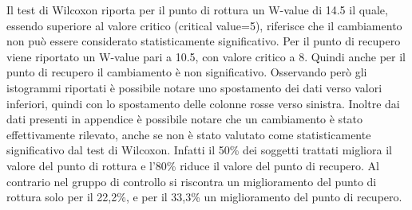 Il test di Wilcoxon riporta per il punto di rottura un W-value di 14.5 il quale, essendo superiore al valore critico (critical value=5), riferisce che il cambiamento non può essere considerato statisticamente significativo. Per il punto di recupero viene riportato un W-value pari a 10.5, con valore critico a 8. Quindi anche per il punto di recupero il cambiamento è non significativo. Osservando però gli istogrammi riportati è possibile notare uno spostamento dei dati verso valori inferiori, quindi con lo spostamento delle colonne rosse verso sinistra. Inoltre dai dati presenti in appendice è possibile notare che un cambiamento è stato effettivamente rilevato, anche se non è stato valutato come statisticamente significativo dal test di Wilcoxon. Infatti il 50\% dei soggetti trattati migliora il valore del punto di rottura e l’80\% riduce il valore del punto di recupero. Al contrario nel gruppo di controllo si riscontra un miglioramento del punto di rottura solo per il 22,2\%, e per il 33,3\% un miglioramento del punto di recupero.

